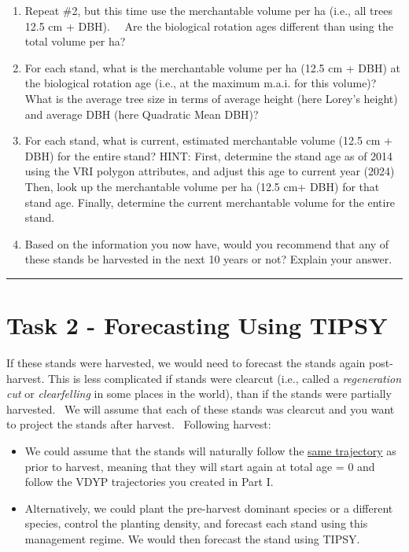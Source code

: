 \documentclass[
  letterpaper,
]{book}
\providecommand{\tightlist}{%
  \setlength{\itemsep}{0pt}\setlength{\parskip}{0pt}}\usepackage{longtable,booktabs,array}
\begin{document}
\begin{enumerate}
\def\labelenumi{\arabic{enumi}.}
\setcounter{enumi}{2}
\tightlist
\item
  Repeat \#2, but this time use the merchantable volume per ha (i.e.,
  all trees 12.5 cm + DBH).~~ Are the biological rotation ages different
  than using the total volume per ha?
\item
  For each stand, what is the merchantable volume per ha (12.5 cm + DBH)
  at the biological rotation age (i.e., at the maximum m.a.i. for this
  volume)?~ What is the average tree size in terms of average height
  (here Lorey's height) and average DBH (here Quadratic Mean DBH)?
\item
  For each stand, what is current, estimated merchantable volume (12.5
  cm + DBH) for the entire stand? HINT: First, determine the stand age
  as of 2014 using the VRI polygon attributes, and adjust this age to
  current year (2024) Then, look up the merchantable volume per ha (12.5
  cm+ DBH) for that stand age. Finally, determine the current
  merchantable volume for the entire stand.
\item
  Based on the information you now have, would you recommend that any of
  these stands be harvested in the next 10 years or not? Explain your
  answer.
\end{enumerate}

\begin{center}\rule{0.5\linewidth}{0.5pt}\end{center}

\hypertarget{task-2---forecasting-using-tipsy}{%
\section{Task 2 - Forecasting Using
TIPSY}\label{task-2---forecasting-using-tipsy}}

If these stands were harvested, we would need to forecast the stands
again post-harvest. This is less complicated if stands were clearcut
(i.e., called a \emph{regeneration cut} or \emph{clearfelling} in some
places in the world), than if the stands were partially harvested.~ We
will assume that each of these stands was clearcut and you want to
project the stands after harvest.~ Following harvest:

\begin{itemize}
\item
  We could assume that the stands will naturally follow the \ul{same
  trajectory} as prior to harvest, meaning that they will start again at
  total age = 0 and follow the VDYP trajectories you created in Part I.~
\item
  Alternatively, we could plant the pre-harvest dominant species or a
  different species, control the planting density, and forecast each
  stand using this management regime. We would then forecast the stand
  using TIPSY.
\end{itemize}
\end{document}

